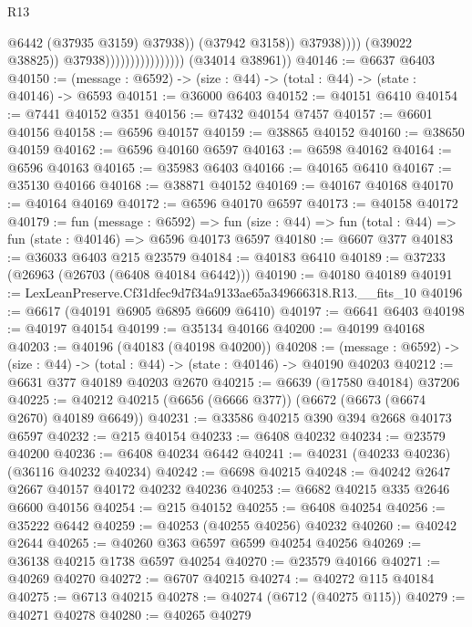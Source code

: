 \begin{lexlean}{R13}
\begin{coremodule}
                                                      @6442
                                                      (@37935 @3159)
                                                      @37938))
                                                  (@37942 @3158))
                                                @37938))))
                                        (@39022 @38825))
                                      @37938))))))))))))))))
      (@34014 @38961))
@40146 := @6637 @6403
@40150 := (message : @6592) -> (size : @44) -> (total : @44) -> (state : @40146) -> @6593
@40151 := @36000 @6403
@40152 := @40151 @6410
@40154 := @7441 @40152 @351
@40156 := @7432 @40154 @7457
@40157 := @6601 @40156
@40158 := @6596 @40157
@40159 := @38865 @40152
@40160 := @38650 @40159
@40162 := @6596 @40160 @6597
@40163 := @6598 @40162
@40164 := @6596 @40163
@40165 := @35983 @6403
@40166 := @40165 @6410
@40167 := @35130 @40166
@40168 := @38871 @40152
@40169 := @40167 @40168
@40170 := @40164 @40169
@40172 := @6596 @40170 @6597
@40173 := @40158 @40172
@40179 := fun (message : @6592) =>
  fun (size : @44) => fun (total : @44) => fun (state : @40146) => @6596 @40173 @6597
@40180 := @6607 @377
@40183 := @36033 @6403 @215 @23579
@40184 := @40183 @6410
@40189 := @37233 (@26963 (@26703 (@6408 @40184 @6442)))
@40190 := @40180 @40189
@40191 := LexLeanPreserve.Cf31dfec9d7f34a9133ae65a349666318.R13.__fits_10
@40196 := @6617 (@40191 @6905 @6895 @6609 @6410)
@40197 := @6641 @6403
@40198 := @40197 @40154
@40199 := @35134 @40166
@40200 := @40199 @40168
@40203 := @40196 (@40183 (@40198 @40200))
@40208 := (message : @6592) -> (size : @44) -> (total : @44) -> (state : @40146) -> @40190 @40203
@40212 := @6631 @377 @40189 @40203 @2670
@40215 := @6639 (@17580 @40184) @37206
@40225 := @40212 @40215 (@6656 (@6666 @377)) (@6672 (@6673 (@6674 @2670) @40189 @6649))
@40231 := @33586 @40215 @390 @394 @2668 @40173 @6597
@40232 := @215 @40154
@40233 := @6408 @40232
@40234 := @23579 @40200
@40236 := @6408 @40234 @6442
@40241 := @40231 (@40233 @40236) (@36116 @40232 @40234)
@40242 := @6698 @40215
@40248 := @40242 @2647 @2667 @40157 @40172 @40232 @40236
@40253 := @6682 @40215 @335 @2646 @6600 @40156
@40254 := @215 @40152
@40255 := @6408 @40254
@40256 := @35222 @6442
@40259 := @40253 (@40255 @40256) @40232
@40260 := @40242 @2644
@40265 := @40260 @363 @6597 @6599 @40254 @40256
@40269 := @36138 @40215 @1738 @6597 @40254
@40270 := @23579 @40166
@40271 := @40269 @40270
@40272 := @6707 @40215
@40274 := @40272 @115 @40184
@40275 := @6713 @40215
@40278 := @40274 (@6712 (@40275 @115))
@40279 := @40271 @40278
@40280 := @40265 @40279

\end{coremodule}
\end{lexlean}
